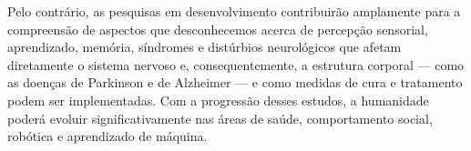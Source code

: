 {Pelo contrário, as pesquisas em desenvolvimento contribuirão amplamente para a compreensão de aspectos que desconhecemos acerca de percepção sensorial, aprendizado, memória, síndromes e distúrbios neurológicos que afetam diretamente o sistema nervoso e, consequentemente, a estrutura corporal --- como as doenças de Parkinson e de Alzheimer --- e como medidas de cura e tratamento podem ser implementadas. Com a progressão desses estudos, a humanidade poderá evoluir significativamente nas áreas de saúde, comportamento social, robótica e aprendizado de máquina.

}

